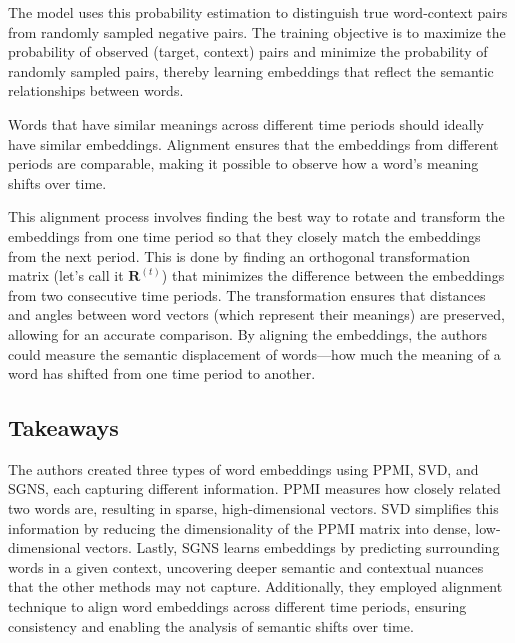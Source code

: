 The model uses this probability estimation to distinguish true word-context pairs from randomly sampled negative pairs.
The training objective is to maximize the probability of observed (target, context) pairs and minimize the probability of randomly sampled pairs, thereby learning embeddings that reflect the semantic relationships between words.

Words that have similar meanings across different time periods should ideally have similar embeddings.
Alignment ensures that the embeddings from different periods are comparable, making it possible to observe how a word’s meaning shifts over time.

This alignment process involves finding the best way to rotate and transform the embeddings from one time period so that they closely match the embeddings from the next period.
This is done by finding an orthogonal transformation matrix (let’s call it $\mathbf{R}^{(t)}$) that minimizes the difference between the embeddings from two consecutive time periods.
The transformation ensures that distances and angles between word vectors (which represent their meanings) are preserved, allowing for an accurate comparison.
By aligning the embeddings, the authors could measure the semantic displacement of words—how much the meaning of a word has shifted from one time period to another.

\subsection{Takeaways}\label{subsec:hamilton_takeaways1}
The authors created three types of word embeddings using PPMI, SVD, and SGNS, each capturing different information.
PPMI measures how closely related two words are, resulting in sparse, high-dimensional vectors.
SVD simplifies this information by reducing the dimensionality of the PPMI matrix into dense, low-dimensional vectors.
Lastly, SGNS learns embeddings by predicting surrounding words in a given context, uncovering deeper semantic and contextual nuances that the other methods may not capture.
Additionally, they employed alignment technique to align word embeddings across different time periods, ensuring consistency and enabling the analysis of semantic shifts over time.

